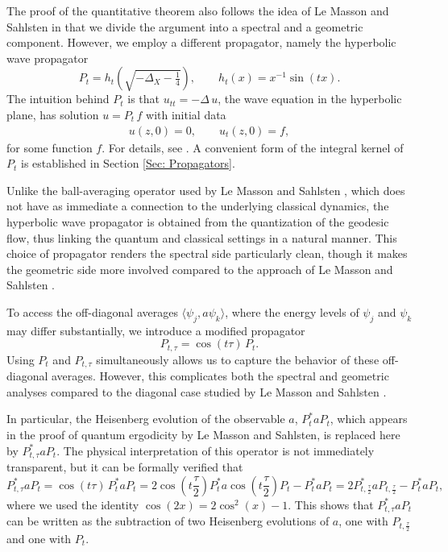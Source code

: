 \documentclass[11pt,twoside,reqno]{amsart} \usepackage{a4wide} \usepackage[T1]{fontenc} \usepackage[utf8]{inputenc} \usepackage{soul}  \usepackage{amsmath} \usepackage{amsfonts} \usepackage{amssymb} \usepackage{mathtools} \usepackage{amsthm} \usepackage{xcolor} \usepackage{graphicx} \usepackage{hyperref} \usepackage{standalone} \usepackage{esint} \usepackage{comment} \usepackage[left=2.3cm,top=3cm,right=2.3cm]{geometry} \usepackage{bm} \usepackage{svg} \usepackage{float} \numberwithin{equation}{section} \theoremstyle{plain} \newtheorem{thm}{Theorem}[section] \newtheorem{theorem}[thm]{Theorem} \newtheorem*{theorem*}{Theorem}\newtheorem{conj}[thm]{Conjecture} \newtheorem{lemma}[thm]{Lemma} \newtheorem{prop}[thm]{Proposition} \newtheorem{proposition}[thm]{Proposition} \newtheorem{cor}[thm]{Corollary} \newtheorem{question}[thm]{Question} \newtheorem{corollary}[thm]{Corollary} \newtheorem{assumption}[thm]{Assumption} \theoremstyle{definition} \newtheorem{defn}[thm]{Definition} \newtheorem{choice}[thm]{Choice} \newtheorem{definition}[thm]{Definition} \newtheorem{ex}[thm]{Example} \newtheorem{notation}[thm]{Notation} \newtheorem*{ack}{Acknowledgements} \theoremstyle{remark} \newtheorem{remark}[thm]{Remark} \newtheorem{bigremark}[thm]{Remark} \usepackage{xcolor} \newcommand{\red}[1]{ {\color{Red}#1} } \newcommand{\blue}[1]{ {\color{Blue}#1} } \author{Kai Hippi} \address{Aalto University, Espoo, Finland} \email{kai.hippi@aalto.fi}
\begin{document}
The proof of the quantitative theorem also follows the idea of Le Masson and Sahlsten \cite{LS17} in that we divide the argument into a spectral and a geometric component. However, we employ a different propagator, namely the hyperbolic wave propagator
$$
    P_{t} = h_{t}\!\left( \sqrt{ -\Delta_{X} - \tfrac{1}{4} } \right),
    \qquad h_{t}(x) = x^{-1} \sin(tx).
$$
The intuition behind $ P_{t} $ is that $u_{tt} = -\Delta \, u$, the wave equation in the hyperbolic plane, has solution $u = P_{t} \, f$
with initial data
\begin{align*}
	u( z,0 ) = 0, \qquad u_{t}( z,0 ) =  f,
\end{align*}
for some function $ f $. For details, see \cite{LP82}. A convenient form of the integral kernel of $ P_{t} $ is established in Section \ref{Sec: Propagators}.

Unlike the ball-averaging operator used by Le Masson and Sahlsten \cite{LS17}, which does not have as immediate a connection to the underlying classical dynamics, the hyperbolic wave propagator is obtained from the quantization of the geodesic flow, thus linking the quantum and classical settings in a natural manner. This choice of propagator renders the spectral side particularly clean, though it makes the geometric side more involved compared to the approach of Le Masson and Sahlsten \cite{LS17}.

To access the off-diagonal averages \( \langle \psi_{j}, a \psi_{k} \rangle \), where the energy levels of \( \psi_{j} \) and \( \psi_{k} \) may differ substantially, we introduce a modified propagator
\[
P_{t,\tau} = \cos(t \tau)\, P_{t}.
\]  
Using \( P_{t} \) and \( P_{t,\tau} \) simultaneously allows us to capture the behavior of these off-diagonal averages. However, this complicates both the spectral and geometric analyses compared to the diagonal case studied by Le Masson and Sahlsten \cite{LS17}.

In particular, the Heisenberg evolution of the observable \( a \), \( P_{t}^{*} a P_{t} \), which appears in the proof of quantum ergodicity by Le Masson and Sahlsten, is replaced here by \( P_{t,\tau}^{*} a P_{t} \). The physical interpretation of this operator is not immediately transparent, but it can be formally verified that
\[
P_{t,\tau}^{*} a P_{t}
= \cos(t \tau)\, P_{t}^{*} a P_{t} 
= 2 \cos\!\left(t \frac{\tau}{2}\right) P_{t}^{*} a \cos\!\left(t \frac{\tau}{2}\right) P_{t} - P_{t}^{*} a P_{t} 
= 2 P_{t,\frac{\tau}{2}}^{*} a P_{t,\frac{\tau}{2}} - P_{t}^{*} a P_{t},
\]
where we used the identity \(\cos(2x) = 2 \cos^2(x) - 1\). This shows that \( P_{t,\tau}^{*} a P_{t} \) can be written as the subtraction of two Heisenberg evolutions of \( a \), one with \( P_{t,\frac{\tau}{2}} \) and one with \( P_t \).
\end{document}
